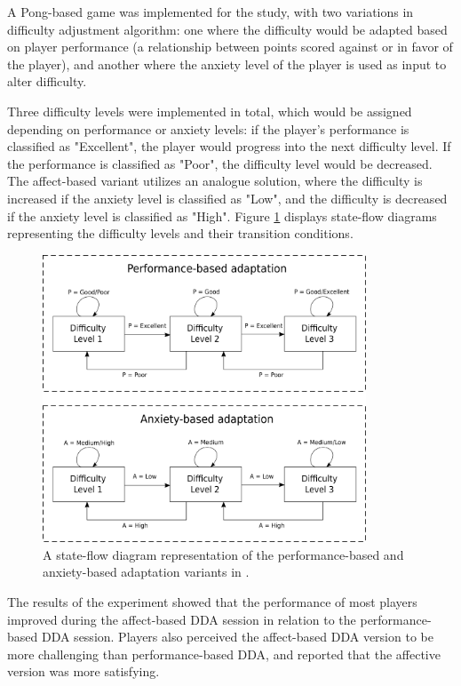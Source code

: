 A Pong-based game was implemented for the study, with two variations in difficulty adjustment algorithm: one where the difficulty would be adapted based on player performance (a relationship between points scored against or in favor of the player), and another where the anxiety level of the player is used as input to alter difficulty.

Three difficulty levels were implemented in total, which would be assigned depending on performance or anxiety levels: if the player's performance is classified as "Excellent", the player would progress into the next difficulty level. If the performance is classified as "Poor", the difficulty level would be decreased. The affect-based variant utilizes an analogue solution, where the difficulty is increased if the anxiety level is classified as "Low", and the difficulty is decreased if the anxiety level is classified as "High". Figure \ref{fig:affective-adaptation} displays state-flow diagrams representing the difficulty levels and their transition conditions.

\begin{figure}[!h]
    \caption{A state-flow diagram representation of the performance-based and anxiety-based adaptation variants in \cite{article_affectivedda}.}
    \begin{center}
        \includegraphics[width=26em]{figures/fig-affective-adaptation.png}
    \end{center}
    \label{fig:affective-adaptation}
\end{figure}

The results of the experiment showed that the performance of most players improved during the affect-based DDA session in relation to the performance-based DDA session. Players also perceived the affect-based DDA version to be more challenging than performance-based DDA, and reported that the affective version was more satisfying.

